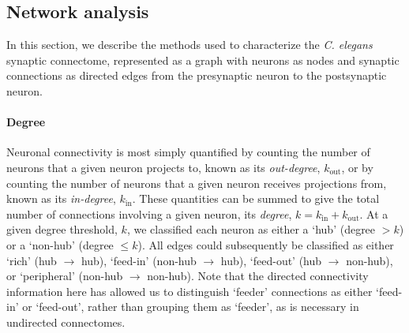 \documentclass[10pt,letterpaper]{article}
\begin{document}
\subsection*{Network analysis}

In this section, we describe the methods used to characterize the \emph{C. elegans} synaptic connectome, represented as a graph with neurons as nodes and synaptic connections as directed edges from the presynaptic neuron to the postsynaptic neuron.

\paragraph{Degree}
Neuronal connectivity is most simply quantified by counting the number of neurons that a given neuron projects to, known as its \emph{out-degree}, $k_\mathrm{out}$, or by counting the number of neurons that a given neuron receives projections from, known as its \emph{in-degree}, $k_\mathrm{in}$.
These quantities can be summed to give the total number of connections involving a given neuron, its \emph{degree}, $k = k_\mathrm{in} + k_\mathrm{out}$.
At a given degree threshold, $k$, we classified each neuron as either a `hub' (degree $>k$) or a `non-hub' (degree $\leq k$).
All edges could subsequently be classified as either `rich' (hub $\rightarrow$ hub), `feed-in' (non-hub $\rightarrow$ hub), `feed-out' (hub $\rightarrow$ non-hub), or `peripheral' (non-hub $\rightarrow$ non-hub).
Note that the directed connectivity information here has allowed us to distinguish `feeder' connections as either `feed-in' or `feed-out', rather than grouping them as `feeder', as is necessary in undirected connectomes.
\end{document}
